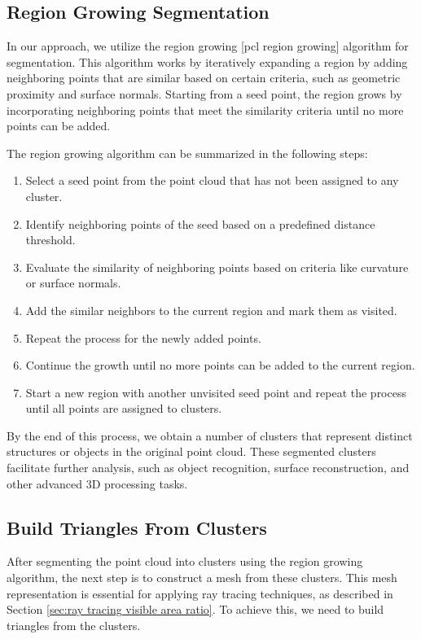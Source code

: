 \documentclass[11pt, a4paper,oneside,chapterprefix=false]{scrbook}
\begin{document}
\subsection{Region Growing Segmentation}

In our approach, we utilize the region growing [pcl region growing] algorithm for segmentation. This algorithm works by iteratively expanding a region by adding neighboring points that are similar based on certain criteria, such as geometric proximity and surface normals. Starting from a seed point, the region grows by incorporating neighboring points that meet the similarity criteria until no more points can be added.

The region growing algorithm can be summarized in the following steps:
\begin{enumerate}
    \item Select a seed point from the point cloud that has not been assigned to any cluster.
    \item Identify neighboring points of the seed based on a predefined distance threshold.
    \item Evaluate the similarity of neighboring points based on criteria like curvature or surface normals.
    \item Add the similar neighbors to the current region and mark them as visited.
    \item Repeat the process for the newly added points.
    \item Continue the growth until no more points can be added to the current region.
    \item Start a new region with another unvisited seed point and repeat the process until all points are assigned to clusters.
\end{enumerate}

By the end of this process, we obtain a number of clusters that represent distinct structures or objects in the original point cloud. These segmented clusters facilitate further analysis, such as object recognition, surface reconstruction, and other advanced 3D processing tasks.


\subsection{Build Triangles From Clusters}

After segmenting the point cloud into clusters using the region growing algorithm, the next step is to construct a mesh from these clusters. This mesh representation is essential for applying ray tracing techniques, as described in Section \ref{sec:ray tracing visible area ratio}. To achieve this, we need to build triangles from the clusters.
\end{document}
